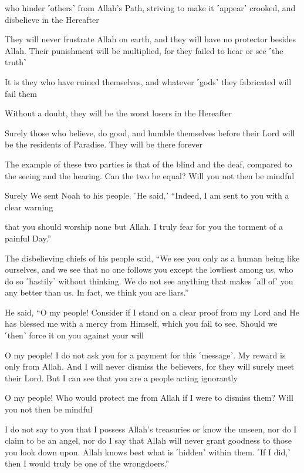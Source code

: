 who hinder ˹others˺ from Allah’s Path, striving to make it ˹appear˺ crooked, and disbelieve in the Hereafter

They will never frustrate Allah on earth, and they will have no protector besides Allah. Their punishment will be multiplied, for they failed to hear or see ˹the truth˺

It is they who have ruined themselves, and whatever ˹gods˺ they fabricated will fail them

Without a doubt, they will be the worst losers in the Hereafter

Surely those who believe, do good, and humble themselves before their Lord will be the residents of Paradise. They will be there forever

The example of these two parties is that of the blind and the deaf, compared to the seeing and the hearing. Can the two be equal? Will you not then be mindful

Surely We sent Noah to his people. ˹He said,˺ “Indeed, I am sent to you with a clear warning

that you should worship none but Allah. I truly fear for you the torment of a painful Day.”

The disbelieving chiefs of his people said, “We see you only as a human being like ourselves, and we see that no one follows you except the lowliest among us, who do so ˹hastily˺ without thinking. We do not see anything that makes ˹all of˺ you any better than us. In fact, we think you are liars.”

He said, “O my people! Consider if I stand on a clear proof from my Lord and He has blessed me with a mercy from Himself, which you fail to see. Should we ˹then˺ force it on you against your will

O my people! I do not ask you for a payment for this ˹message˺. My reward is only from Allah. And I will never dismiss the believers, for they will surely meet their Lord. But I can see that you are a people acting ignorantly

O my people! Who would protect me from Allah if I were to dismiss them? Will you not then be mindful

I do not say to you that I possess Allah’s treasuries or know the unseen, nor do I claim to be an angel, nor do I say that Allah will never grant goodness to those you look down upon. Allah knows best what is ˹hidden˺ within them. ˹If I did,˺ then I would truly be one of the wrongdoers.”

